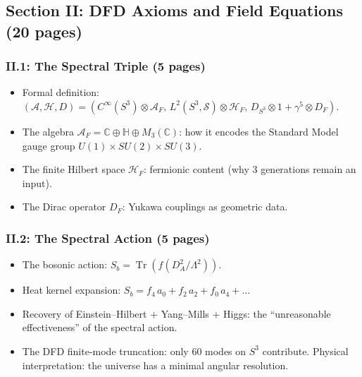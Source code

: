 \documentclass[11pt,a4paper]{article}
\newcommand{\Tr}{\operatorname{Tr}}
\begin{document}
\subsection{Section II: DFD Axioms and Field Equations (20 pages)}

\subsubsection{II.1: The Spectral Triple (5 pages)}
\begin{itemize}
\item Formal definition: $(\mathcal{A}, \mathcal{H}, D) = (C^\infty(S^3) \otimes \mathcal{A}_F,\, L^2(S^3, \mathcal{S}) \otimes \mathcal{H}_F,\, D_{S^3} \otimes 1 + \gamma^5 \otimes D_F)$.
\item The algebra $\mathcal{A}_F = \mathbb{C} \oplus \mathbb{H} \oplus M_3(\mathbb{C})$: how it encodes the Standard Model gauge group $U(1) \times SU(2) \times SU(3)$.
\item The finite Hilbert space $\mathcal{H}_F$: fermionic content (why 3 generations remain an input).
\item The Dirac operator $D_F$: Yukawa couplings as geometric data.
\end{itemize}

\subsubsection{II.2: The Spectral Action (5 pages)}
\begin{itemize}
\item The bosonic action: $S_b = \Tr(f(D_A^2/\Lambda^2))$.
\item Heat kernel expansion: $S_b = f_4\,a_0 + f_2\,a_2 + f_0\,a_4 + \ldots$
\item Recovery of Einstein--Hilbert + Yang--Mills + Higgs: the ``unreasonable effectiveness'' of the spectral action.
\item The DFD finite-mode truncation: only 60 modes on $S^3$ contribute. Physical interpretation: the universe has a minimal angular resolution.
\end{itemize}
\end{document}
